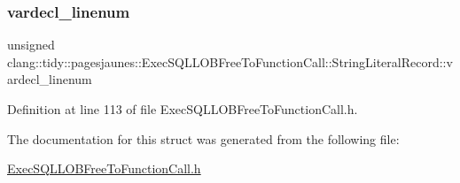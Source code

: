\subsubsection{\texorpdfstring{vardecl\+\_\+linenum}{vardecl\_linenum}}
{\footnotesize\ttfamily unsigned clang\+::tidy\+::pagesjaunes\+::\+Exec\+S\+Q\+L\+L\+O\+B\+Free\+To\+Function\+Call\+::\+String\+Literal\+Record\+::vardecl\+\_\+linenum}



Definition at line 113 of file Exec\+S\+Q\+L\+L\+O\+B\+Free\+To\+Function\+Call.\+h.



The documentation for this struct was generated from the following file\+:\begin{DoxyCompactItemize}
\item 
\hyperlink{_exec_s_q_l_l_o_b_free_to_function_call_8h}{Exec\+S\+Q\+L\+L\+O\+B\+Free\+To\+Function\+Call.\+h}\end{DoxyCompactItemize}
